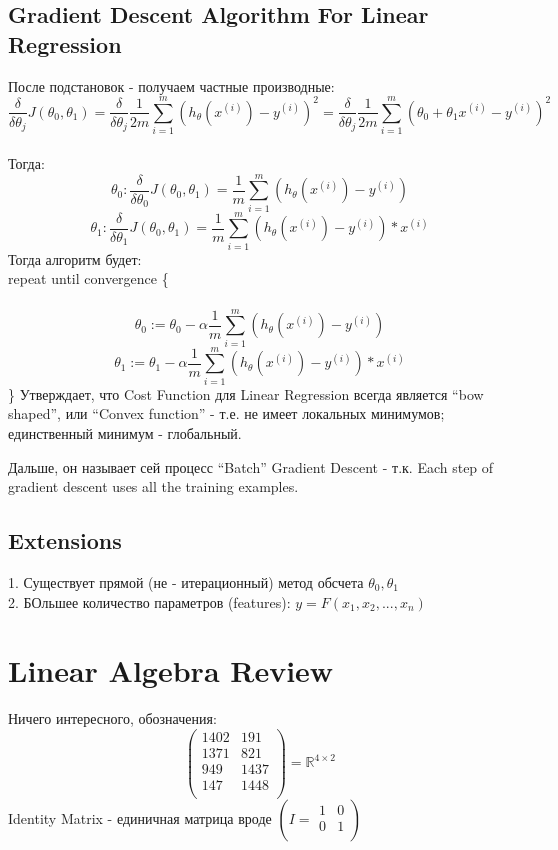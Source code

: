\documentclass{scrartcl}
\begin{document}
\subsection {Gradient Descent Algorithm For Linear Regression }
\label {2-7}
После подстановок - получаем частные производные:
\[ \frac {\delta}{\delta \theta_j} J(\theta_0, \theta_1) = \frac
{\delta}{\delta \theta_j} \frac{1}{2m} \sum\limits_{i=1}^m\left(
  h_\theta (x^{(i)}) - y^{(i)} \right)^2 = \frac {\delta}{\delta
  \theta_j} \frac{1}{2m} \sum\limits_{i=1}^m\left(\theta_0 + \theta_1
  x^{(i)} - y^{(i)} \right)^2
\] \\
Тогда:
\[
\theta_0 : \frac {\delta}{\delta \theta_0} J(\theta_0, \theta_1) =
\frac{1}{m} \sum\limits_{i=1}^m\left(h_\theta (x^{(i)}) - y^{(i)}
\right) \]
\[
\theta_1 : \frac {\delta}{\delta \theta_1} J(\theta_0, \theta_1) =
\frac{1}{m} \sum\limits_{i=1}^m\left(h_\theta (x^{(i)}) - y^{(i)}
\right) * x^{(i)}
\]
Тогда алгоритм будет: \\
repeat until convergence \{ \\
\
\[\theta_0 := \theta_0 - {\alpha} \frac{1}{m}
\sum\limits_{i=1}^m\left(h_\theta (x^{(i)}) - y^{(i)} \right) \]
\[\theta_1 := \theta_1 - {\alpha} \frac{1}{m}
\sum\limits_{i=1}^m\left(h_\theta (x^{(i)}) - y^{(i)} \right) *
x^{(i)} \] \} Утверждает, что Cost Function для Linear Regression
всегда является ``bow shaped'', или ``Convex function'' - т.е. не
имеет локальных минимумов; единственный минимум - глобальный.

Дальше, он называет сей процесс ``Batch'' Gradient Descent - т.к. Each
step of gradient descent uses all the training examples.

\subsection {Extensions}
\label {2-8}
1. Существует прямой (не - итерационный) метод обсчета $\theta_0,
\theta_1$ \\
2. БОльшее количество параметров (features): $y = F(x_1, x_2, ...,
x_n)$

\label{Chapter 3}
\section {Linear Algebra Review}
Ничего интересного, обозначения:
\[
\left( \begin{array}{cc}
    1402 & 191 \\
    1371 & 821 \\ 949 & 1437 \\ 147 & 1448 \\
  \end{array} \right) = \mathbb{R}^{4\times2}
\]
Identity Matrix - единичная матрица вроде $\left( I
  = \begin{array}{cc}
    1 & 0 \\ 0 & 1 \\
  \end{array}
\right)$
\end{document}
